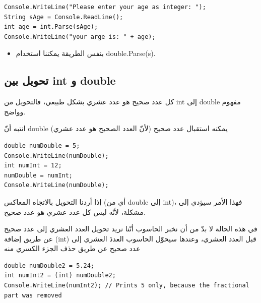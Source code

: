 \documentclass[14pt]{extarticle}
\begin{document}
\begin{boxExample}
\begin{english}
\begin{verbatim}
Console.WriteLine("Please enter your age as integer: ");
String sAge = Console.ReadLine();
int age = int.Parse(sAge);
Console.WriteLine("your arge is: " + age);
\end{verbatim}
\end{english}
\end{boxExample}

\begin{itemize}
\item بنفس الطريقة يمكننا استخدام \textenglish{double.Parse(s)}.
\end{itemize}

\subsection{تحويل بين \textenglish{int} و \textenglish{double}}

كل عدد صحيح هو عدد عشري بشكل طبيعي، فالتحويل من \textenglish{int} إلى \textenglish{double} مفهوم وواضح.

انتبه أنّ \textenglish{double} يمكنه استقبال عدد صحيح (لأنّ العدد الصحيح هو عدد عشري)

\begin{boxExample}
\begin{english}
\begin{verbatim}
double numDouble = 5;
Console.WriteLine(numDouble);
int numInt = 12;
numDouble = numInt;
Console.WriteLine(numDouble);
\end{verbatim}
\end{english}
\end{boxExample}

إذا أردنا التحويل بالاتجاه المعاكس (أي من \textenglish{double} إلى \textenglish{int})، فهذا الأمر سيؤدي إلى مشكلة، لأنّه ليس كل عدد عشري هو عدد صحيح.

في هذه الحالة لا بدّ من أن نخبر الحاسوب أنّنا نريد تحويل العدد العشري إلى عدد صحيح عن طريق إضافة \textenglish{(int)} قبل العدد العشري، وعندها سيحوّل الحاسوب العددَ العشري إلى عدد صحيح عن طريق حذف الجزء الكسري منه

\begin{boxExample}
\begin{english}
\begin{verbatim}
double numDouble2 = 5.24;
int numInt2 = (int) numDouble2;
Console.WriteLine(numInt2); // Prints 5 only, because the fractional part was removed
\end{verbatim}
\end{english}
\end{boxExample}
\end{document}
